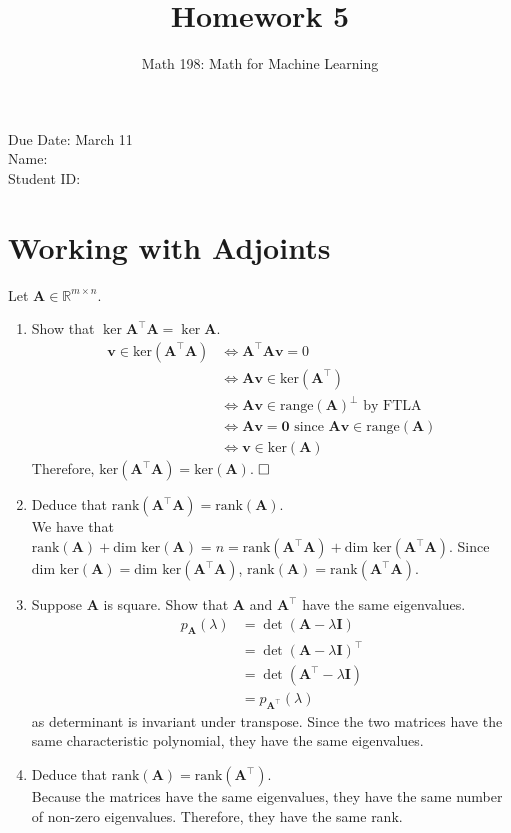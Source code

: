 \documentclass{article}
\title{Homework 5}
\author{Math 198: Math for Machine Learning}
\date{}
\begin{document}
\maketitle

\noindent
Due Date: March 11 \\
Name: \\
Student ID:

\section{Working with Adjoints}
Let $\textbf{A} \in \mathbb{R}^{m \times n}$.
\begin{enumerate}[label=(\alph*)]
\item Show that $\ker \textbf{A}^\top \textbf{A} = \ker \textbf{A}$. \\
{\color{blue} \begin{align*}
\mathbf{v} \in \text{ker}(\mathbf{A^{\top}A}) &\iff \mathbf{A^{\top}Av} = 0 \\
&\iff \mathbf{Av} \in \text{ker}(\mathbf{A^{\top}})\\
&\iff \mathbf{Av} \in \text{range}(\mathbf{A})^{\perp} \text{ by FTLA} \\
&\iff \mathbf{Av = 0} \text{ since } \mathbf{Av} \in \text{range}(\mathbf{A}) \\
&\iff \mathbf{v} \in \text{ker}(\mathbf{A})
\end{align*} Therefore, $\text{ker}(\mathbf{A^{\top}A}) = \text{ker}(\mathbf{A})$. $\hfill\square$}
\item Deduce that $\text{rank}( \textbf{A}^\top \textbf{A}) = \text{rank}(\textbf{A})$. \\
{\color{blue} We have that $\text{rank}(\mathbf{A}) + \text{dim ker}(\mathbf{A}) = n = \text{rank}(\mathbf{A^{\top}A}) + \text{dim ker}(\mathbf{A^{\top}A})$. Since $\text{dim ker}(\mathbf{A}) = \text{dim ker}(\mathbf{A^\top A})$, $\text{rank}(\mathbf{A}) = \text{rank}(\mathbf{A^{\top}A})$.}
\item Suppose $\mathbf{A}$ is square. Show that $\textbf{A}$ and $\textbf{A}^\top$ have the same eigenvalues. \\
{\color{blue} \begin{align*} 
p_{\mathbf{A}}(\lambda) &= \det (\mathbf{A} - \lambda\mathbf{I}) \\
&= \det(\mathbf{A} - \lambda\mathbf{I})^{\top} \\
&= \det(\mathbf{A^{\top}} - \lambda\mathbf{I}) \\
&= p_{\mathbf{A^{\top}}}(\lambda)
\end{align*} as determinant is invariant under transpose. Since the two matrices have the same characteristic polynomial, they have the same eigenvalues.}
\item Deduce that $\text{rank}(\textbf{A}) = \text{rank}(\textbf{A}^\top)$. \\
{\color{blue} Because the matrices have the same eigenvalues, they have the same number of non-zero eigenvalues. Therefore, they have the same rank.}
\end{enumerate}
\end{document}
